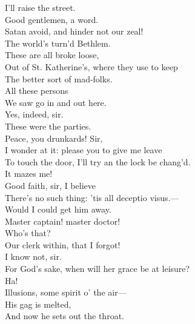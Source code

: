 \documentclass[a4paper,oneside]{memoir}
\begin{document}
\begin{drama*}
\kastrilspeaks I'll raise the street.\\
\lovewitspeaks {} Good gentlemen, a word.\\
\ananiasspeaks Satan avoid, and hinder not our zeal!\\
\lovewitspeaks The world's turn'd Bethlem.\\
\facespeaks {} These are all broke loose,\\
Out of St. Katherine's, where they use to keep\\
The better sort of mad-folks.\\
\neighonespeaks {} All these persons\\
We saw go in and out here.\\
\neightwospeaks {} Yes, indeed, sir.\\
\neighthreespeaks These were the parties.\\
\facespeaks {} Peace, you drunkards! Sir,\\
I wonder at it: please you to give me leave\\
To touch the door, I'll try an the lock be chang'd.\\
\lovewitspeaks It mazes me!\\
\facespeaks {} Good faith, sir, I believe\\
There's no such thing: 'tis all deceptio visus.---\\
Would I could get him away.\\
\dapperspeaks {} Master captain! master doctor!\\
\lovewitspeaks {} Who's that?\\
\facespeaks {} Our clerk within, that I forgot!\\
I know not, sir.\\
\dapperspeaks {} For God's sake, when will her grace be at leisure?\\
\facespeaks {} Ha!\\
Illusions, some spirit o' the air---\\
His gag is melted,\\
And now he sets out the throat.\\

\end{drama*}
\end{document}
